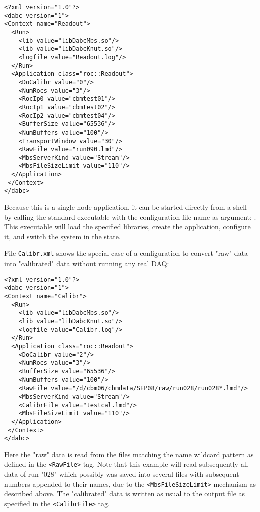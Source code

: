\begin{verbatim}
<?xml version="1.0"?>
<dabc version="1">
<Context name="Readout">
  <Run>
    <lib value="libDabcMbs.so"/>
    <lib value="libDabcKnut.so"/>
    <logfile value="Readout.log"/>
  </Run>
  <Application class="roc::Readout">
    <DoCalibr value="0"/>
    <NumRocs value="3"/>
    <RocIp0 value="cbmtest01"/>
    <RocIp1 value="cbmtest02"/>
    <RocIp2 value="cbmtest04"/>
    <BufferSize value="65536"/>
    <NumBuffers value="100"/>
    <TransportWindow value="30"/>
    <RawFile value="run090.lmd"/>
    <MbsServerKind value="Stream"/>
    <MbsFileSizeLimit value="110"/>
  </Application>
 </Context>
</dabc>
\end{verbatim}

Because this is a single-node application, 
it can be started directly from a shell 
by calling the standard 
executable with the configuration file name as argument:
. 
This executable will load the specified libraries,
create the application, configure it, and switch the system in 
the  state.   

File  {\tt Calibr.xml} shows the special case of a configuration to convert 
"raw" data into "calibrated" data without running any real DAQ:


\begin{verbatim}
<?xml version="1.0"?>
<dabc version="1">
<Context name="Calibr">
  <Run>
    <lib value="libDabcMbs.so"/>
    <lib value="libDabcKnut.so"/>
    <logfile value="Calibr.log"/>
  </Run>
  <Application class="roc::Readout">
    <DoCalibr value="2"/>
    <NumRocs value="3"/>
    <BufferSize value="65536"/>
    <NumBuffers value="100"/>
    <RawFile value="/d/cbm06/cbmdata/SEP08/raw/run028/run028*.lmd"/>
    <MbsServerKind value="Stream"/>
    <CalibrFile value="testcal.lmd"/>
    <MbsFileSizeLimit value="110"/>
  </Application>
 </Context>
</dabc>
\end{verbatim}

Here the "raw" data is read from the files matching the name wildcard pattern 
as defined in the {\tt <RawFile>} tag. Note that this example will 
read subsequently all data of run "028" which possibly was saved
into several files with subsequent numbers appended to their names, due to the 
{\tt <MbsFileSizeLimit>} mechanism as described above.
The "calibrated" data is written as usual to the output file
as specified in the {\tt <CalibrFile>} tag.

 